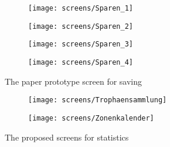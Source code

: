 \begin{figure}[h]
	\centering
	\begin{subfigure}[b]{0.24\columnwidth}
		\centering
		\texttt{[image: screens/Sparen\_1]}
		\label{fig:sparen:professional}
	\end{subfigure}
	\begin{subfigure}[b]{0.24\columnwidth}
		\centering
		\texttt{[image: screens/Sparen\_2]}
		\label{fig:sparen:optimizer}
	\end{subfigure}
	\begin{subfigure}[b]{0.24\columnwidth}
		\centering
		\texttt{[image: screens/Sparen\_3]}
		\label{fig:sparen:indifferent}
	\end{subfigure}
	\begin{subfigure}[b]{0.24\columnwidth}
		\centering
		\texttt{[image: screens/Sparen\_4]}
		\label{fig:sparen:hedonist}
	\end{subfigure}
	\caption{The paper prototype screen for saving}
	\label{fig:sparen} %
\end{figure}

\begin{figure}[h]
	\centering
	\begin{subfigure}[b]{0.24\columnwidth}
		\centering
		\texttt{[image: screens/Trophaensammlung]}
		\label{fig:trophaen}
	\end{subfigure}
	\begin{subfigure}[b]{0.24\columnwidth}
		\centering
		\texttt{[image: screens/Zonenkalender]}
		\label{fig:zonen:optimizer}
	\end{subfigure}
	\caption{The proposed screens for statistics}
	\label{fig:kalender-} %
\end{figure}
